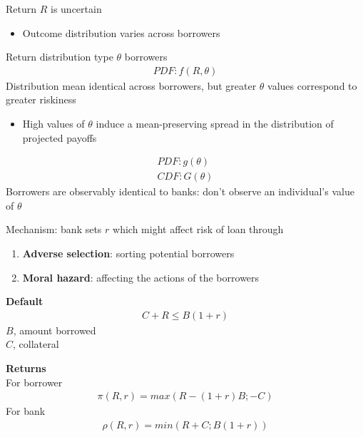 \documentclass{beamer}
\begin{document}
\begin{frame} 
 Return $R$ is uncertain
 \begin{itemize}
   \item Outcome distribution varies across borrowers 
 \end{itemize}
 \medskip
 Return distribution type $\theta$ borrowers 
 \begin{align}
   PDF: f(R,\theta)
 \end{align}
 \medskip
 Distribution mean identical across borrowers, but greater $\theta$ values correspond to greater riskiness
 \begin{itemize}
   \item High values of $\theta$ induce a mean-preserving spread in the distribution of projected payoffs   
 \end{itemize}
 \begin{align}
   PDF: g(\theta)\\
   CDF: G(\theta)
 \end{align}
 \medskip
 Borrowers are observably identical to banks: don't observe an individual's value of $\theta$
 
\end{frame}

\begin{frame}
 Mechanism: bank sets $r$ which might affect risk of loan through
\begin{enumerate}
  \item \textbf{Adverse selection}: sorting potential borrowers
  \item \textbf{Moral hazard}: affecting the actions of the borrowers
\end{enumerate}
\end{frame}

\begin{frame}
 \textbf{Default} 
\begin{align}
  C+R\leq B(1+r)
\end{align}
\medskip
$B$, amount borrowed\\
$C$, collateral
\end{frame}

\begin{frame}
 \textbf{Returns}\\
 \medskip
 For borrower 
\begin{align}
  \pi(R,r)=max(R-(1+r)B;-C)
\end{align}
\medskip
For bank
\begin{align}
  \rho(R,r)=min(R+C;B(1+r))
\end{align}
\end{frame}
\end{document}
